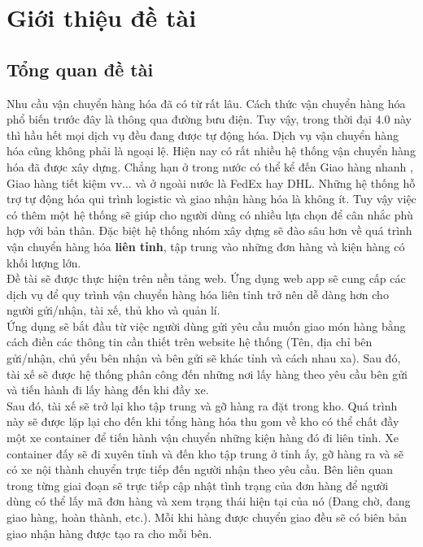  \chapter{Giới thiệu đề tài}\label{chap:introduction}
	
	\section{Tổng quan đề tài}
	Nhu cầu vận chuyển hàng hóa đã có từ rất lâu. Cách thức vận chuyển hàng hóa phổ biến trước đây là thông qua đường bưu điện. Tuy vậy, trong thời đại 4.0 này thì hầu hết mọi dịch vụ đều đang được tự động hóa. Dịch vụ vận chuyển hàng hóa cũng không phải là ngoại lệ. Hiện nay có rất nhiều hệ thống vận chuyển hàng hóa đã được xây dựng. Chẳng hạn ở trong nước có thể kể đến Giao hàng nhanh \cite{ghn}, Giao hàng tiết kiệm \cite{ghtk} vv... và ở ngoài nước là FedEx hay DHL. Những hệ thống hỗ trợ tự động hóa qui trình logistic và giao nhận hàng hóa là không ít. Tuy vậy việc có thêm một hệ thống sẽ giúp cho người dùng có nhiều lựa chọn để cân nhắc phù hợp với bản thân. Đặc biệt hệ thống nhóm xây dựng sẽ đào sâu hơn về quá trình vận chuyển hàng hóa
	\textbf{liên tỉnh}, tập trung vào những đơn hàng và kiện hàng có khối lượng lớn.\\
	
	Đề tài sẽ được thực hiện trên nền tảng web. Ứng dụng web app sẽ cung cấp các dịch vụ để quy trình vận chuyển hàng hóa liên tỉnh trở nên dễ dàng hơn cho người gửi/nhận, tài xế, thủ kho và quản lí.\\
	
	Ứng dụng sẽ bắt đầu từ việc người dùng gửi yêu cầu muốn giao món hàng bằng cách điền các thông tin cần thiết trên website hệ thống (Tên, địa chỉ bên gửi/nhận, chủ yếu bên nhận và bên gửi sẽ khác tỉnh và cách nhau xa). Sau đó, tài xế sẽ được hệ thống phân công đến những nơi lấy hàng theo yêu cầu bên gửi và tiến hành đi lấy hàng đến khi đầy xe.\\
	
	Sau đó, tài xế sẽ trở lại kho tập trung và gỡ hàng ra đặt trong kho. Quá trình này sẽ được lặp lại cho đến khi tổng hàng hóa thu gom về kho có thể chất đầy một xe container để tiến hành vận chuyển những kiện hàng đó đi liên tỉnh. Xe container đấy sẽ đi xuyên tỉnh và đến kho tập trung ở tỉnh ấy, gỡ hàng ra và sẽ có xe nội thành chuyển trực tiếp đến người nhận theo yêu cầu. Bên liên quan trong từng giai đoạn sẽ trực tiếp cập nhật tình trạng của đơn hàng để người dùng có thể lấy mã đơn hàng và xem trạng thái hiện tại của nó (Đang chờ, đang giao hàng, hoàn thành, etc.). Mỗi khi hàng được chuyển giao đều sẽ có biên bản giao nhận hàng được tạo ra cho mỗi bên.
	
